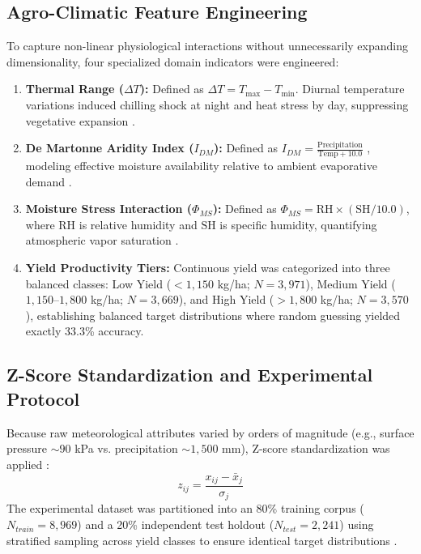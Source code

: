 \documentclass[conference]{IEEEtran}
\begin{document}
\subsection{Agro-Climatic Feature Engineering}
To capture non-linear physiological interactions without unnecessarily expanding dimensionality, four specialized domain indicators were engineered:
\begin{enumerate}
    \item \textbf{Thermal Range ($\Delta T$):} Defined as $\Delta T = T_{\max} - T_{\min}$. Diurnal temperature variations induced chilling shock at night and heat stress by day, suppressing vegetative expansion \cite{schlenker2009}.
    \item \textbf{De Martonne Aridity Index ($I_{DM}$):} Defined as $I_{DM} = \frac{\text{Precipitation}}{\text{Temp} + 10.0}$ \cite{demartonne1926}, modeling effective moisture availability relative to ambient evaporative demand \cite{lobell2008}.
    \item \textbf{Moisture Stress Interaction ($\Phi_{MS}$):} Defined as $\Phi_{MS} = \text{RH} \times (\text{SH} / 10.0)$, where $\text{RH}$ is relative humidity and $\text{SH}$ is specific humidity, quantifying atmospheric vapor saturation \cite{schlenker2009}.
    \item \textbf{Yield Productivity Tiers:} Continuous yield was categorized into three balanced classes: Low Yield ($< 1,150$ kg/ha; $N=3,971$), Medium Yield ($1,150$--$1,800$ kg/ha; $N=3,669$), and High Yield ($> 1,800$ kg/ha; $N=3,570$), establishing balanced target distributions where random guessing yielded exactly 33.3\% accuracy.
\end{enumerate}

\subsection{Z-Score Standardization and Experimental Protocol}
Because raw meteorological attributes varied by orders of magnitude (e.g., surface pressure $\sim 90$ kPa vs. precipitation $\sim 1,500$ mm), Z-score standardization was applied \cite{hastie2009}:
\begin{equation}
z_{ij} = \frac{x_{ij} - \bar{x}_j}{\sigma_j}
\end{equation}
The experimental dataset was partitioned into an 80\% training corpus ($N_{train} = 8,969$) and a 20\% independent test holdout ($N_{test} = 2,241$) using stratified sampling across yield classes to ensure identical target distributions \cite{hastie2009}.
\end{document}
